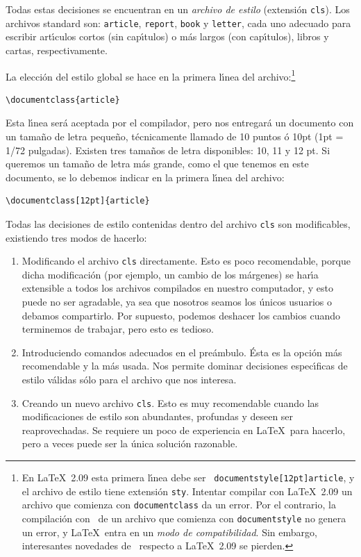 Todas estas decisiones se encuentran en un {\em archivo de estilo\/}
(extensi{\'o}n \verb+cls+). Los archivos standard son: \verb+article+,
\verb+report+, \verb+book+ y \verb+letter+, cada uno adecuado para
escribir art\'{\i}culos cortos (sin cap\'{\i}tulos) o m{\'a}s largos (con
cap\'{\i}tulos), libros y cartas, respectivamente.

La elecci{\'o}n del estilo global se hace en la primera l\'{\i}nea del
archivo:\footnote{En \LaTeX\ 2.09 esta primera l\'{\i}nea debe ser {\tt
    \bslash documentstyle[12pt]{article}}, y el archivo de estilo
  tiene extensi{\'o}n {\tt sty}. Intentar compilar con \LaTeX\ 2.09 un
  archivo que comienza con {\tt \bslash documentclass} da un error.
  Por el contrario, la compilaci{\'o}n con \LaTeXe\ de un archivo que
  comienza con {\tt \bslash documentstyle} no genera un error, y
  \LaTeX\ entra en un {\em modo de compatibilidad\/}. Sin embargo,
  interesantes novedades de \LaTeXe\ respecto a \LaTeX\ 2.09 se
  pierden.}

\begin{verbatim}
\documentclass{article}
\end{verbatim}

Esta l\'{\i}nea ser{\'a} aceptada por el compilador, pero nos
entregar{\'a} un documento con un tama{\~n}o de letra peque{\~n}o,
t{\'e}cnicamente llamado de 10 puntos {\'o} 10pt (1pt = 1/72
pulgadas). Existen tres tama{\~n}os de letra disponibles: 10, 11 y 12
pt. Si queremos un tama{\~n}o de letra m{\'a}s grande, como el que
tenemos en este documento, se lo debemos indicar en la primera
l\'{\i}nea del archivo:
\begin{verbatim}
\documentclass[12pt]{article}
\end{verbatim}

Todas las decisiones de estilo contenidas dentro del archivo
\verb+cls+ son modificables, existiendo tres modos de hacerlo:
\begin{enumerate}
\item[a)] Modificando el archivo \verb+cls+ directamente. Esto es
poco recomendable, porque dicha modificaci{\'o}n (por ejemplo, un
cambio de los m{\'a}rgenes) se har\'{\i}a
extensible a todos los archivos compilados en nuestro computador, y
esto puede no ser agradable, ya sea que nosotros seamos los {\'u}nicos
usuarios o debamos compartirlo.  Por supuesto, podemos deshacer los
cambios cuando terminemos de trabajar, pero esto es tedioso.
\item[b)] Introduciendo comandos adecuados en el pre{\'a}mbulo. {\'E}sta
es la opci{\'o}n m{\'a}s recomendable y la m{\'a}s usada. Nos permite
dominar decisiones espec\'{\i}ficas de estilo v{\'a}lidas s{\'o}lo para
el archivo que nos interesa.
\item[c)] Creando un nuevo archivo \verb+cls+. Esto es muy
recomendable cuando las modificaciones de estilo son abundantes,
profundas y deseen ser reaprovechadas. Se requiere un poco de
experiencia en \LaTeX\ para hacerlo, pero a veces puede ser la
{\'u}nica soluci{\'o}n razonable.
\end{enumerate}

